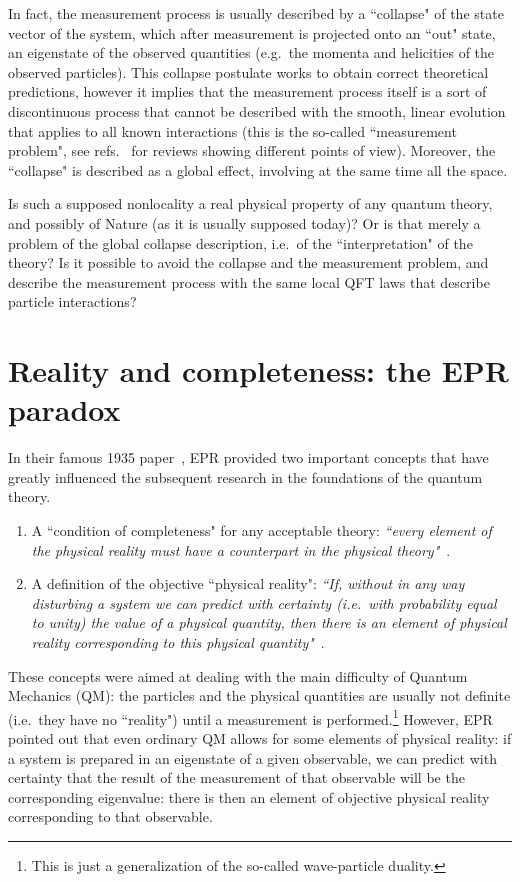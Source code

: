 \documentclass[12pt]{article}
\begin{document}
In fact, the measurement process is usually described by a ``collapse"
of the state vector of the system, which after measurement is
projected onto an ``out" state, an eigenstate of the observed
quantities (e.g.\ the momenta and helicities of the observed
particles). This collapse postulate works to obtain correct
theoretical predictions, however it implies that the measurement
process itself is a sort of discontinuous process that cannot be
described with the smooth, linear evolution that applies to all known
interactions (this is the so-called ``measurement problem", see
refs.~\cite{Ballentine70,Laloe} for reviews showing different points
of view). Moreover, the ``collapse" is described as a global effect,
involving at the same time all the space.

Is such a supposed nonlocality a real physical property of any quantum
theory, and possibly of Nature (as it is usually supposed today)? Or
is that merely a problem of the global collapse description, i.e.\ of
the ``interpretation" of the theory? Is it possible to avoid the
collapse and the measurement problem, and describe the measurement
process with the same local QFT laws that describe particle
interactions?


\section{Reality and completeness: the EPR paradox} 

In their famous 1935 paper~\cite{EPR}, EPR provided two important
concepts that have greatly influenced the subsequent research in the
foundations of the quantum theory.
{\renewcommand{\theenumi}{\Roman{enumi}}
\begin{enumerate}   
\item A ``condition of completeness" for any acceptable theory: {\it
``every element of the physical reality must have a counterpart in
the physical theory"}~\cite{EPR}.

\item A definition of the objective ``physical reality": \emph{``If,
without in any way disturbing a system we can predict with
certainty (i.e.\ with probability equal to unity) the value of a
physical quantity, then there is an element of physical reality
corresponding to this physical quantity"}~\cite{EPR}.
\end{enumerate}}

These concepts were aimed at dealing with the main difficulty of
Quantum Mechanics (QM): the particles and the physical quantities are
usually not definite (i.e.\ they have no ``reality") until a
measurement is performed.\footnote{This is just a generalization of
the so-called wave-particle duality.} However, EPR pointed out that
even ordinary QM allows for some elements of physical reality: if a
system is prepared in an eigenstate of a given observable, we can
predict with certainty that the result of the measurement of that
observable will be the corresponding eigenvalue: there is then an
element of objective physical reality corresponding to that
observable.
\end{document}
